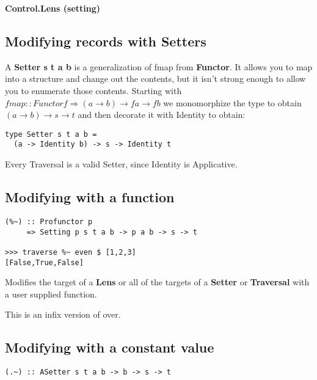 {\huge \bfseries Control.Lens (setting) \\[0.2cm]}

\HRule%

\begin{multicols}{2}

\begin{box1}
\subsection *{Modifying records with Setters}
A \textbf{Setter s t a b} is a generalization of fmap from \textbf{Functor}. It
allows you to map into a structure and change out the contents, but it isn't
strong enough to allow you to enumerate those contents. Starting with
$fmap :: Functor f \Rightarrow (a \to b) \to f a \to f b$ we monomorphize the type
to obtain $(a \to b) \to s \to t$ and then decorate it with Identity to obtain:

\begin{verbatim}
type Setter s t a b =
  (a -> Identity b) -> s -> Identity t
\end{verbatim}

Every Traversal is a valid Setter, since Identity is Applicative.

\end{box1}

\begin{box2}
\subsection *{Modifying with a function}
\begin{verbatim}
(%~) :: Profunctor p
     => Setting p s t a b -> p a b -> s -> t

>>> traverse %~ even $ [1,2,3]
[False,True,False]
\end{verbatim}

Modifies the target of a \textbf{Lens} or all of the targets of a
\textbf{Setter} or \textbf{Traversal} with a user supplied function.

This is an infix version of over.
\end{box2}

\begin{box1}
\subsection *{Modifying with a constant value}
\begin{verbatim}
(.~) :: ASetter s t a b -> b -> s -> t


\end{verbatim}
\end{box1}
\end{multicols}
